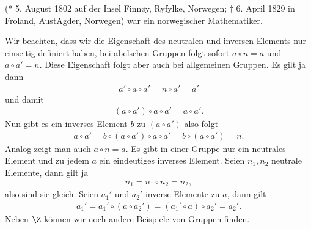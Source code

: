 \documentclass[letterpaper,10pt,english]{jupyterBook}
\begin{document}
\begin{sphinxShadowBox}

 (* 5. August 1802 auf der Insel Finnøy, Ryfylke, Norwegen; † 6. April 1829 in Froland, Aust\sphinxhyphen{}Agder, Norwegen) war ein norwegischer Mathematiker.
\end{sphinxShadowBox}

Wir beachten, dass wir die Eigenschaft des neutralen und inversen Elements nur einseitig definiert haben, bei abelschen Gruppen folgt sofort \(a \circ n = a\) und \(a \circ a'=n\). Diese Eigenschaft folgt aber auch bei allgemeinen Gruppen. Es gilt ja dann
\begin{equation*}
\begin{split}a' \circ a  \circ a' = n \circ a' = a'\end{split}
\end{equation*}
und damit
\begin{equation*}
\begin{split}(a \circ a') \circ a \circ a' = a \circ a' .\end{split}
\end{equation*}
Nun gibt es ein inverses Element \(b\) zu \((a \circ a')\) also folgt
\begin{equation*}
\begin{split}a \circ a' = b \circ (a \circ a') \circ a \circ a' = b \circ (a \circ a') = n.\end{split}
\end{equation*}
Analog zeigt man auch \(a \circ n = a\).
Es gibt in einer Gruppe nur ein neutrales Element und zu jedem \(a\) ein eindeutiges inverses Element. Seien \(n_1,n_2\) neutrale Elemente, dann gilt ja
\begin{equation*}
\begin{split}n_1 = n_1 \circ n_2 = n_2,\end{split}
\end{equation*}
also sind sie gleich. Seien \(a_1'\) und \(a_2'\) inverse Elemente zu \(a\), dann gilt
\begin{equation*}
\begin{split}a_1' = a_1' \circ (a \circ a_2') = (a_1' \circ a) \circ a_2' = a_2'.\end{split}
\end{equation*}
Neben \(\Z\) können wir noch andere Beispiele von Gruppen finden.
\label{grundlagen/zahlensysteme:example-5}
\end{document}
